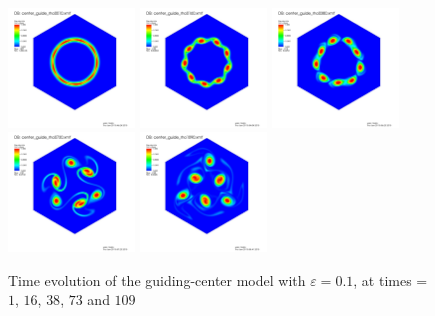 \documentclass[proc]{edpsmath}
\begin{document}
\begin{figure}[h!]
	\includegraphics[width=0.3\textwidth]{figures/gc_spl_1.jpeg}
	\includegraphics[width=0.3\textwidth]{figures/gc_spl_2.jpeg}
	\includegraphics[width=0.3\textwidth]{figures/gc_spl_3.jpeg}
	\includegraphics[width=0.3\textwidth]{figures/gc_spl_4.jpeg}
	\includegraphics[width=0.3\textwidth]{figures/gc_spl_5.jpeg}
	\caption{Time evolution of the guiding-center model with $\varepsilon = 0.1$, at times = $1$, $16$, $38$, $73$ and $109$}
	\label{fig:mode9} 
\end{figure}
\end{document}
